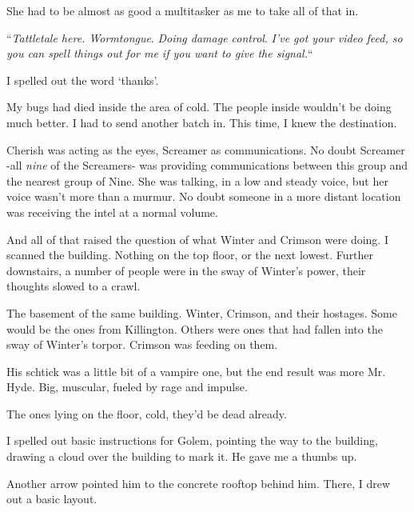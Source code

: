 She had to be almost as good a multitasker as me to take all of that in.



``\emph{Tattletale here.  Wormtongue}.\emph{  Doing damage control}.  \emph{I've got your video feed, so you can spell things out for me if you want to give the signal.}``



I spelled out the word `thanks'.



My bugs had died inside the area of cold.  The people inside wouldn't be doing much better.  I had to send another batch in.  This time, I knew the destination.



Cherish was acting as the eyes, Screamer as communications.  No doubt Screamer -all \emph{nine} of the Screamers- was providing communications between this group and the nearest group of Nine.  She was talking, in a low and steady voice, but her voice wasn't more than a murmur.  No doubt someone in a more distant location was receiving the intel at a normal volume.



And all of that raised the question of what Winter and Crimson were doing.  I scanned the building.  Nothing on the top floor, or the next lowest.  Further downstairs, a number of people were in the sway of Winter's power, their thoughts slowed to a crawl.



The basement of the same building.  Winter, Crimson, and their hostages.  Some would be the ones from Killington.  Others were ones that had fallen into the sway of Winter's torpor.  Crimson was feeding on them.



His schtick was a little bit of a vampire one, but the end result was more Mr. Hyde.  Big, muscular, fueled by rage and impulse.



The ones lying on the floor, cold, they'd be dead already.



I spelled out basic instructions for Golem, pointing the way to the building, drawing a cloud over the building to mark it.  He gave me a thumbs up.



Another arrow pointed him to the concrete rooftop behind him.  There, I drew out a basic layout.



